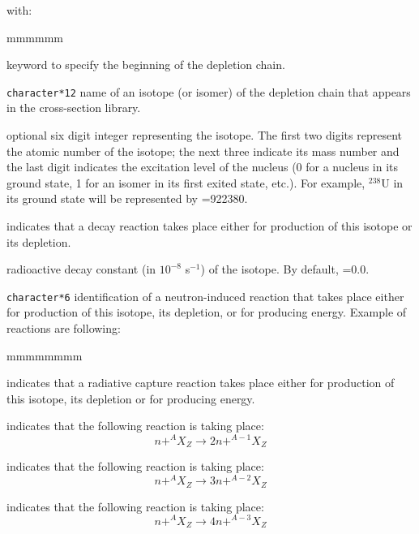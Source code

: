 \vspace{-0.15cm}

\noindent
with:

\begin{ListeDeDescription}{mmmmmm}

\item[\moc{CHAIN}] keyword to specify the beginning of the depletion chain.

\item[\dusa{NAMDPL}] {\tt character*12} name of an isotope (or isomer) of the
depletion chain that appears in the cross-section library.

\item[\dusa{izae}] optional six digit integer representing the isotope. The first two
digits represent the atomic number of the isotope; the next three indicate its
mass number and the last digit indicates the  excitation level of the nucleus (0
for a nucleus in its ground state, 1 for an isomer in its first exited state,
etc.). For example, $^{238}$U in its ground state will be represented by
=922380.

\item[\moc{DECAY}] indicates that a decay reaction takes place either for
production of this isotope or its depletion.

\item[\dusa{dcr}] radioactive decay constant (in $10^{-8}$ s$^{-1}$) of the
isotope. By default, =0.0.

\item[\dusa{reaction}] {\tt character*6} identification of a neutron-induced
reaction that takes place either for production of this isotope, its depletion,
or for producing energy. Example of reactions are following:

\begin{ListeDeDescription}{mmmmmmmm}
\item[\moc{NG}] indicates that a radiative capture reaction takes place either
for production of this isotope, its depletion or for producing energy.

\item[\moc{N2N}] indicates that the following reaction is taking place:
$$ n +^{A}X_Z \to 2 n + ^{A-1}X_Z$$

\item[\moc{N3N}] indicates that the following reaction is taking place:
$$ n +^{A}X_Z \to 3 n + ^{A-2}X_Z$$

\item[\moc{N4N}] indicates that the following reaction is taking place:
$$ n +^{A}X_Z \to 4 n + ^{A-3}X_Z$$


\end{ListeDeDescription}
\end{ListeDeDescription}
